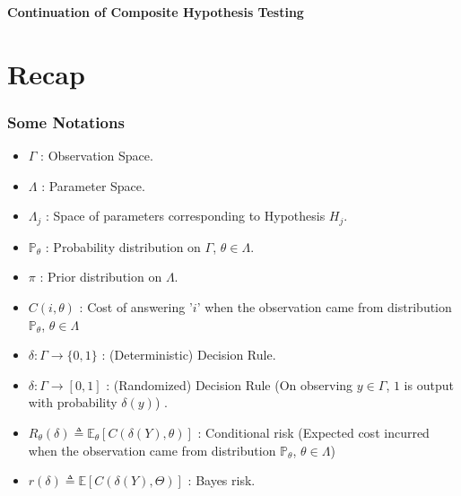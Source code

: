 \documentclass[12pt]{report}
\begin{document}
\maketitle

\begin{center}
{\Large \bf Continuation of Composite Hypothesis Testing}
\end{center}

\section{Recap}


\subsubsection{Some Notations}
\begin{itemize}
    \item $\Gamma$ : Observation Space.
    \item $\Lambda$ : Parameter Space.
    \item $\Lambda_j$ : Space of parameters corresponding to Hypothesis $H_j$.
    \item $\mathbb{P}_{\theta}$ : Probability distribution on $\Gamma$, $\theta \in \Lambda$.
    \item $\pi$ : Prior distribution on $\Lambda$.
    \item $C(i,\theta)$ : Cost of answering '$i$' when the observation came from distribution $\mathbb{P}_{\theta}$, $\theta \in \Lambda$
    \item $\delta: \Gamma \to \{0, 1\}$ : (Deterministic) Decision Rule.
    \item $\delta: \Gamma \to [0, 1]$ : (Randomized) Decision Rule (On observing $y \in \Gamma$,  $1$ is output with probability $\delta(y)$) .
    \item $R_{\theta}(\delta) \triangleq \mathbb{E}_{\theta}[C(\delta(Y),\theta)]$ : Conditional risk (Expected cost incurred when the observation came from distribution $\mathbb{P}_{\theta}$, $\theta \in \Lambda$)
    \item $r(\delta) \triangleq \mathbb{E}[C(\delta(Y),\Theta)]$ : Bayes risk.
    
\end{itemize}
\end{document}
